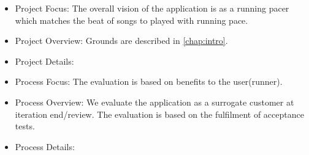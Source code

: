 \begin{itemize}
\item Project Focus: The overall vision of the application is as a running pacer which matches the beat of songs to played with running pace.
\item Project Overview: Grounds are described in \cref{chap:intro}.
\item Project Details: 
\item Process Focus: The evaluation is based on benefits to the user(runner).
\item Process Overview: We evaluate the application as a surrogate customer at iteration end/review. The evaluation is based on the fulfilment of acceptance tests.
\item Process Details: 

\end{itemize}